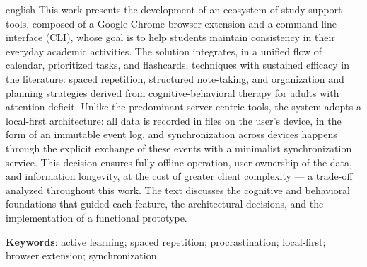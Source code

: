 \documentclass[12pt, %
openright, 
oneside,
a4paper,
english,   %
brazil]{facom-ufu-abntex2}
\begin{document}
\begin{resumo}[Abstract]
\begin{otherlanguage*}{english}
This work presents the development of an ecosystem of study-support tools,
composed of a Google Chrome browser extension and a command-line interface
(CLI), whose goal is to help students maintain consistency in their everyday
academic activities. The solution integrates, in a unified flow of calendar,
prioritized tasks, and flashcards, techniques with sustained efficacy in the
literature: spaced repetition, structured note-taking, and organization and
planning strategies derived from cognitive-behavioral therapy for adults with
attention deficit. Unlike the predominant server-centric tools, the system
adopts a local-first architecture: all data is recorded in files on the
user's device, in the form of an immutable event log, and synchronization
across devices happens through the explicit exchange of these events with a
minimalist synchronization service. This decision ensures fully offline
operation, user ownership of the data, and information longevity, at the cost
of greater client complexity --- a trade-off analyzed throughout this work.
The text discusses the cognitive and behavioral foundations that guided each
feature, the architectural decisions, and the implementation of a functional
prototype.

\textbf{Keywords}: active learning; spaced repetition; procrastination;
local-first; browser extension; synchronization.
\end{otherlanguage*}
\end{resumo}


\listoffigures*
\cleardoublepage

\listoftables*
\cleardoublepage




\end{document}
